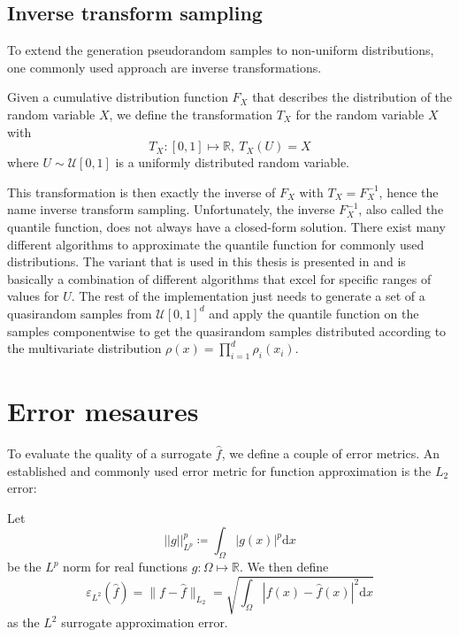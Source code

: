 \documentclass[
  a4paper,  %
  twoside,  %
  bibliography=totoc,
  headsepline,
  cleardoublepage=empty,
  parskip=half,
  draft=false
]{scrbook}
\begin{document}
\subsection{Inverse transform sampling}
To extend the generation pseudorandom samples to non-uniform distributions, one commonly used approach are inverse transformations.
\begin{definition}
Given a cumulative distribution function $F_X$ that describes the distribution of the random variable $X$, we define the transformation $T_X$ for the random variable $X$ with
\begin{equation}
T_X \colon [0,1] \mapsto \mathds{R}, ~ T_X(U)=X
\end{equation}
where $U \sim \mathcal{U}[0,1]$ is a uniformly distributed random variable.
\end{definition}
This transformation is then exactly the inverse of $F_X$ with $T_X=F_X^{-1}$, hence the name inverse transform sampling.
Unfortunately, the inverse $F_X^{-1}$, also called the quantile function, does not always have a closed-form solution.
There exist many different algorithms to approximate the quantile function for commonly used distributions.
The variant that is used in this thesis is presented in \cite{} and is basically a combination of different algorithms that excel for specific ranges of values for $U$.
The rest of the implementation just needs to generate a set of a quasirandom samples from $\mathcal{U}[0,1]^d$ and apply the quantile function on the samples componentwise to get the quasirandom samples distributed according to the multivariate distribution $\rho(x)=\prod_{i=1}^d \rho_i(x_i)$.

\section{Error mesaures}

To evaluate the quality of a surrogate $\hat{f}$, we define a couple of error metrics.
An established and commonly used error metric for function approximation is the $L_2$ error:
\begin{definition}[$L_2$ error]
Let
\begin{equation}
||g||_{L^p}^p \coloneqq \int_{\Omega} |g(x)|^p \text{d}x
\end{equation}
be the $L^p$ norm for real functions $g \colon \Omega \mapsto \mathds{R}$.
We then define
\begin{equation}
\varepsilon_{\text{$L^2$}}(\hat{f})=\|f - \hat{f}\|_{L_2}=\sqrt{\int_{\Omega} |f(x) - \hat{f}(x)|^2 \text{d}x}
\end{equation}
as the $L^2$ surrogate approximation error.
\label{def:l2}
\end{definition}
\end{document}

